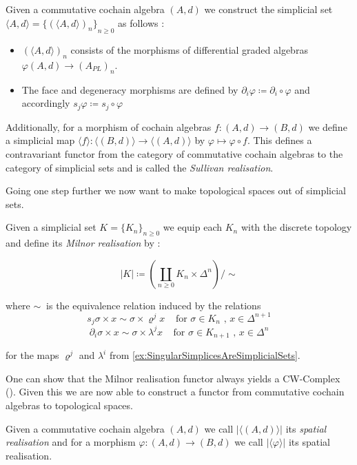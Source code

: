  \begin{Definition}
  Given a commutative cochain algebra $(A,d)$ we construct the simplicial set 
  $\langle A , d \rangle = {\lbrace (\langle A , d \rangle)_n \rbrace}_{n \geq 0}$ as follows : \\
  \begin{itemize}
   \item $(\langle A,d \rangle)_n$ consists of the morphisms of differential graded algebras 
   $\varphi (A,d) \to (A_{PL})_n$.
  \item The face and degeneracy morphisms are defined by $\partial_i \varphi \coloneqq \partial_i \circ \varphi$ and
  accordingly ${s_j \varphi \coloneqq s_j \circ \varphi}$ 
  \end{itemize}

  Additionally, for a morphism of cochain algebras ${f \colon (A,d) \to (B,d)}$ we define a simplicial map
  ${\langle f \rangle \colon \langle (B,d) \rangle \to \langle (A,d) \rangle}$ by
  ${\varphi \mapsto \varphi \circ f}$. \newline
  This defines a contravariant functor from the category of commutative cochain algebras to the category of simplicial sets
  and is called the \emph{Sullivan realisation}.
 \end{Definition}

 Going one step further we now want to make topological spaces out of simplicial sets.
 
 \begin{Definition}
  Given a simplicial set $K = {\lbrace K_n \rbrace}_{n \geq 0}$ we equip each $K_n$ with the discrete topology and define its \emph{Milnor realisation} by :
  
  $$|K| \coloneqq (\coprod_{n \geq 0} K_n \times \Delta^n) / \sim$$
  
  where $\sim ~$ is the equivalence relation induced by the relations
  $$ s_j \sigma \times x \sim \sigma \times \varrho^j x \; \; \; \; \text{for $\sigma \in K_n$ , $x \in \Delta^{n+1}$}$$
  $$ \partial_i \sigma \times x \sim \sigma \times \lambda^j x \; \; \; \; \text{for $\sigma \in K_{n+1}$ , $x \in \Delta^n$}$$
  
  for the maps $\varrho^j$ and $\lambda^i$ from \ref{ex:SingularSimplicesAreSimplicialSets}.
 \end{Definition}
 
 One can show that the Milnor realisation functor always yields a CW-Complex (\cite{Milnor1957}).
 Given this we are now able to construct a functor from commutative cochain algebras to topological spaces.
 
 \begin{Definition}
  Given a commutative cochain algebra $(A,d)$ we call $| \langle (A,d) \rangle |$ its \emph{spatial realisation} and for
  a morphism $\varphi \colon (A,d) \to (B,d)$ we call $|\langle \varphi \rangle|$ its spatial realisation.
 \end{Definition}
